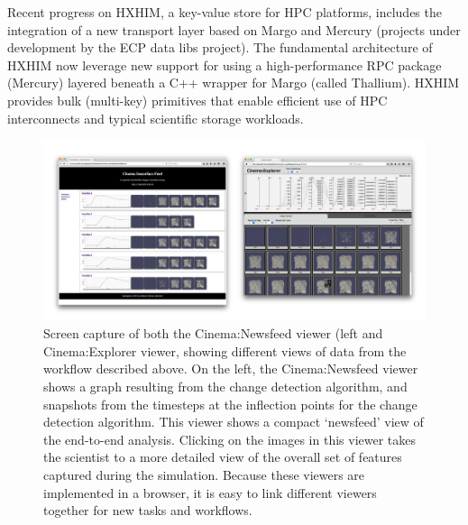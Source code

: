 
Recent progress on HXHIM, a key-value store for HPC platforms, includes the
integration of a new transport layer based on Margo and Mercury (projects
under development by the ECP data libs project). The fundamental architecture
of HXHIM now leverage new support for using a high-performance RPC package
(Mercury) layered beneath a C++ wrapper for Margo (called Thallium). HXHIM
provides bulk (multi-key) primitives that enable efficient use of HPC
interconnects and typical scientific storage workloads.

\begin{figure}[htb]
	\centering
	\includegraphics[width=6in]{projects/2.3.4-DataViz/2.3.4.02-LANL-ATDM-DataViz/cinema}
	\caption{Screen capture of both the
	Cinema:Newsfeed viewer (left and Cinema:Explorer viewer, showing
	different views of data from the workflow described above. On the
	left, the Cinema:Newsfeed viewer shows a graph resulting from the
	change detection algorithm, and snapshots from the timesteps at the
	inflection points for the change detection algorithm. This viewer
	shows a compact `newsfeed' view of the end-to-end analysis. Clicking
	on the images in this viewer takes the scientist to a more detailed
	view of the overall set of features captured during the
	simulation. Because these viewers are implemented in a browser, it is
	easy to link different viewers together for new tasks and workflows. }
\end{figure}

